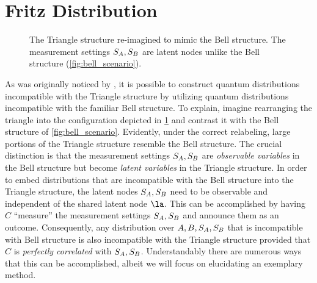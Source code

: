\documentclass[aps, 10pt, english, twoside, pra, nofootinbib, tightenlines, longbibliography, superscriptaddress]{revtex4-1}
\begin{document}
    \section{Fritz Distribution}
    \label{sec:fritz_distribution}
    \begin{figure}
    \begin{center}
        \scalebox{1.0}{}
        \caption{The Triangle structure re-imagined to mimic the Bell structure. The measurement settings $S_{A},S_{B}$ are latent nodes unlike the Bell structure (\cref{fig:bell_scenario}).}
        \label{fig:triangle_structure_with_fritz_bell_embedded}
    \end{center}
    \end{figure}

    As was originally noticed by \citet{Fritz_2012}, it is possible to construct quantum distributions incompatible with the Triangle structure by utilizing quantum distributions incompatible with the familiar Bell structure. To explain, imagine rearranging the triangle into the configuration depicted in \cref{fig:triangle_structure_with_fritz_bell_embedded} and contrast it with the Bell structure of \cref{fig:bell_scenario}. Evidently, under the correct relabeling, large portions of the Triangle structure resemble the Bell structure. The crucial distinction is that the measurement settings $S_{A}, S_{B}$ are \textit{observable variables} in the Bell structure but become \textit{latent variables} in the Triangle structure. In order to embed distributions that are incompatible with the Bell structure into the Triangle structure, the latent nodes $S_{A}, S_{B}$ need to be observable and independent of the shared latent node $\la$. This can be accomplished by having $C$ ``measure'' the measurement settings $S_{A}, S_{B}$ and announce them as an outcome. Consequently, any distribution over $A, B, S_{A}, S_{B}$ that is incompatible with Bell structure is also incompatible with the Triangle structure provided that $C$ is \textit{perfectly correlated} with $S_{A}, S_{B}$. Understandably there are numerous ways that this can be accomplished, albeit we will focus on elucidating an exemplary method.
\end{document}
